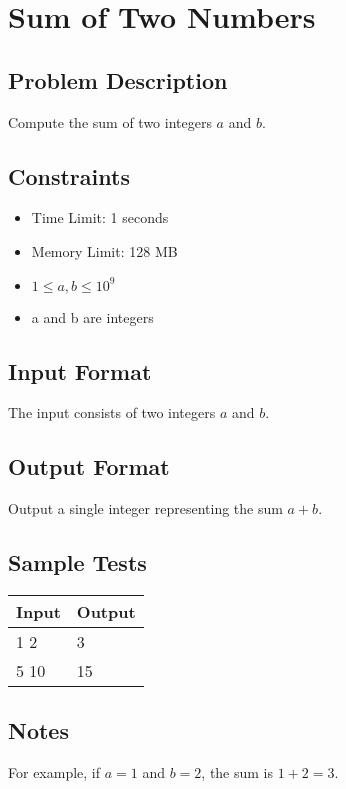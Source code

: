 \documentclass[a4paper]{article}
\begin{document}
\section*{Sum of Two Numbers}

\subsection*{Problem Description}
Compute the sum of two integers \(a\) and \(b\).

\subsection*{Constraints}
\begin{itemize}
  \item Time Limit: 1 seconds
  \item Memory Limit: 128 MB
  \item \( 1 \leq a, b \leq 10^9 \)
\item a and b are integers
\end{itemize}

\subsection*{Input Format}
The input consists of two integers \(a\) and \(b\).

\subsection*{Output Format}
Output a single integer representing the sum \(a + b\).

\subsection*{Sample Tests}
\begin{tabular}{|l|l|}
\hline
\textbf{Input} & \textbf{Output} \\ \hline
1 2 & 3 \\ \hline
5 10 & 15 \\ \hline
\end{tabular}

\subsection*{Notes}
For example, if \(a = 1\) and \(b = 2\), the sum is \(1 + 2 = 3\).
\end{document}
